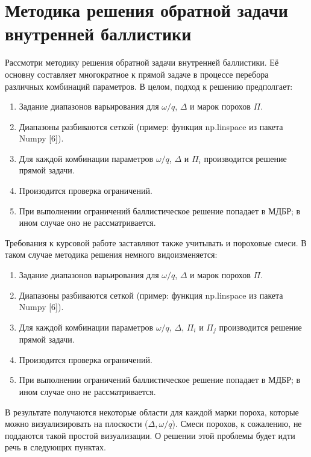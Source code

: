 \documentclass[14pt, a4paper]{extreport} %
\begin{document}
\section{Методика решения обратной задачи внутренней баллистики}
Рассмотри методику решения обратной задачи внутренней баллистики. Её основну составляет многократное к прямой задаче в процессе перебора различных комбинаций параметров.
В целом, подход к решению предполгает: 

\begin{enumerate}
    \item  Задание диапазонов варьирования для  $\omega / q$, $\varDelta $ и марок порохов $\Pi$.
    \item  Диапазоны разбиваются сеткой (пример: функция np.linspace из пакета Numpy [6]).
    \item  Для каждой комбинации параметров  $\omega / q$, $\varDelta $ и  $\Pi_i$ производится решение прямой задачи.
    \item  Произодится проверка ограничений.
    \item  При выполнении ограничений баллистическое решение попадает в МДБР; в ином случае оно не рассматривается.
\end{enumerate}

Требования к курсовой работе заставляют также учитывать и пороховые смеси. В таком случае методика решения немного видоизменяется:

\begin{enumerate}
    \item  Задание диапазонов варьирования для  $\omega / q$, $\varDelta $ и марок порохов $\Pi$.
    \item  Диапазоны разбиваются сеткой (пример: функция np.linspace из пакета Numpy [6]).
    \item  Для каждой комбинации параметров  $\omega / q$, $\varDelta $, $\Pi_i$ и $\Pi_j$ производится решение прямой задачи.
    \item  Произодится проверка ограничений.
    \item  При выполнении ограничений баллистическое решение попадает в МДБР; в ином случае оно не рассматривается.
\end{enumerate}

В результате получаются некоторые области для каждой марки пороха, которые можно визуализировать на плоскости ($\varDelta, \omega / q $).
Смеси порохов, к сожалению, не поддаются такой простой визуализации. О решении этой проблемы будет идти речь в следующих пунктах.
\end{document}
